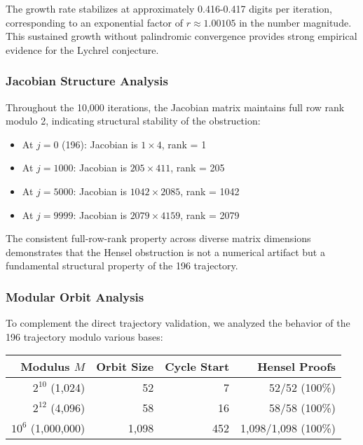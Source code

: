 \documentclass[12pt,a4paper]{article}
\begin{document}
The growth rate stabilizes at approximately 0.416-0.417 digits per iteration, 
corresponding to an exponential factor of $r \approx 1.00105$ in the number 
magnitude. This sustained growth without palindromic convergence provides 
strong empirical evidence for the Lychrel conjecture.

\subsubsection{Jacobian Structure Analysis}

Throughout the 10,000 iterations, the Jacobian matrix maintains full row 
rank modulo 2, indicating structural stability of the obstruction:

\begin{itemize}
\item At $j=0$ (196): Jacobian is $1 \times 4$, rank = 1
\item At $j=1000$: Jacobian is $205 \times 411$, rank = 205
\item At $j=5000$: Jacobian is $1042 \times 2085$, rank = 1042
\item At $j=9999$: Jacobian is $2079 \times 4159$, rank = 2079
\end{itemize}

The consistent full-row-rank property across diverse matrix dimensions 
demonstrates that the Hensel obstruction is not a numerical artifact but 
a fundamental structural property of the 196 trajectory.

\subsubsection{Modular Orbit Analysis}

To complement the direct trajectory validation, we analyzed the behavior 
of the 196 trajectory modulo various bases:

\begin{center}
\begin{tabular}{@{}r r r r@{}}
	\toprule
	\textbf{Modulus $M$} & \textbf{Orbit Size} & \textbf{Cycle Start} & \textbf{Hensel Proofs} \\
\midrule
$2^{10}$ (1,024) & 52 & 7 & 52/52 (100\%) \\
$2^{12}$ (4,096) & 58 & 16 & 58/58 (100\%) \\
$10^6$ (1,000,000) & 1,098 & 452 & 1,098/1,098 (100\%) \\
\bottomrule
\end{tabular}
\end{center}
\end{document}
